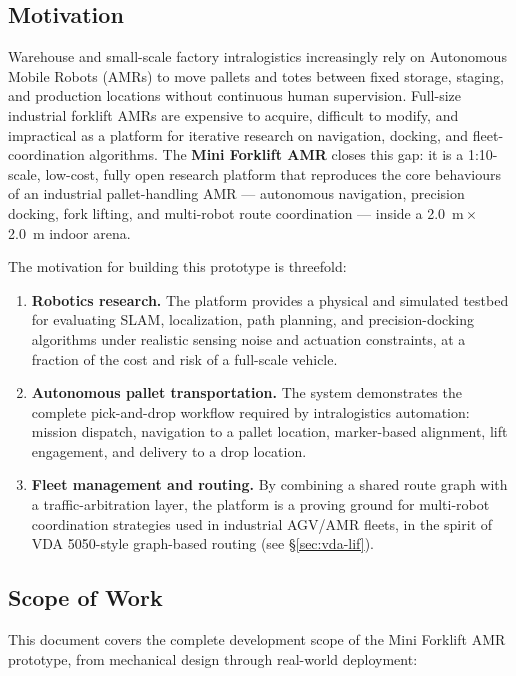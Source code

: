 \documentclass[a4paper, 12pt]{article}
\begin{document}
\subsection{Motivation}

Warehouse and small-scale factory intralogistics increasingly rely on
Autonomous Mobile Robots (AMRs) to move pallets and totes between fixed
storage, staging, and production locations without continuous human
supervision. Full-size industrial forklift AMRs are expensive to acquire,
difficult to modify, and impractical as a platform for iterative research
on navigation, docking, and fleet-coordination algorithms. The
\textbf{Mini Forklift AMR} closes this gap: it is a 1:10-scale, low-cost,
fully open research platform that reproduces the core behaviours of an
industrial pallet-handling AMR --- autonomous navigation, precision
docking, fork lifting, and multi-robot route coordination --- inside a
\SI{2.0}{m}\,$\times$\,\SI{2.0}{m} indoor arena.

The motivation for building this prototype is threefold:

\begin{enumerate}
    \item \textbf{Robotics research.} The platform provides a physical
    and simulated testbed for evaluating SLAM, localization, path
    planning, and precision-docking algorithms under realistic sensing
    noise and actuation constraints, at a fraction of the cost and risk
    of a full-scale vehicle.
    \item \textbf{Autonomous pallet transportation.} The system
    demonstrates the complete pick-and-drop workflow required by
    intralogistics automation: mission dispatch, navigation to a pallet
    location, marker-based alignment, lift engagement, and delivery to a
    drop location.
    \item \textbf{Fleet management and routing.} By combining a shared
    route graph with a traffic-arbitration layer, the platform is a
    proving ground for multi-robot coordination strategies used in
    industrial AGV/AMR fleets, in the spirit of VDA 5050-style
    graph-based routing (see \S\ref{sec:vda-lif}).
\end{enumerate}

\subsection{Scope of Work}

This document covers the complete development scope of the Mini Forklift
AMR prototype, from mechanical design through real-world deployment:
\end{document}
